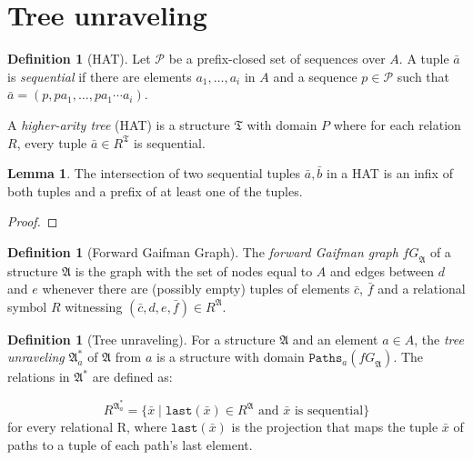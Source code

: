 \documentclass[draft]{scrartcl}
\theoremstyle{definition}
\newtheorem{definition}[theorem]{Definition}
\newtheorem{lemma}[theorem]{Lemma}
\newcommand{\last}[1]{\mathtt{last}(#1)}
\begin{document}
\section{Tree unraveling}

\begin{definition}[HAT]
Let $\mathcal{P}$ be a prefix-closed set of sequences over $A$.
A tuple $\bar{a}$ is \emph{sequential} if there are elements $a_1, \ldots, a_i$ in $A$ and a sequence $p \in \mathcal{P}$ such that $\bar{a} = (p, p a_1, \ldots, p a_1 \cdots a_i)$.

A \emph{higher-arity tree} (HAT) is a structure $\mathfrak{T}$ with domain $P$ where for each relation $R$, every tuple $\bar{a} \in R^\mathfrak{T}$ is sequential.
\end{definition}

\begin{lemma}\label{lemma-seq-intersection}
The intersection of two sequential tuples $\bar{a}, \bar{b}$ in a HAT is an infix of both tuples and a prefix of at least one of the tuples.
\end{lemma}

\begin{proof}
\end{proof}

\begin{definition}[Forward Gaifman Graph]
The \emph{forward Gaifman graph} $\mathit{fG}_\mathfrak{A}$ of a structure $\mathfrak{A}$ is the graph with the set of nodes equal to $A$ and edges between $d$ and $e$ whenever there are (possibly empty) tuples of elements $\bar{c}$, $\bar{f}$ and a relational symbol $R$ witnessing $(\bar{c}, d, e, \bar{f}) \in R^{\mathfrak{A}}$.
\end{definition}

\begin{definition}[Tree unraveling]
For a structure $\mathfrak{A}$ and an element $a \in A$, the \emph{tree unraveling} $\mathfrak{A}^*_a$ of $\mathfrak{A}$ from $a$ is a structure with domain $\mathtt{Paths}_a(\mathit{fG}_\mathfrak{A})$. The relations in $\mathfrak{A}^*$ are defined as:

\[
R^{\mathfrak{A}^*_a} = \{ \bar{x} \mid \text{$\last{\bar{x}} \in R^{\mathfrak{A}}$ and $\bar{x}$ is sequential} \}
\]
for every relational R, where $\last{\bar{x}}$ is the projection that maps the tuple $\bar{x}$ of paths to a tuple of each path's last element.
\end{definition}
\end{document}
